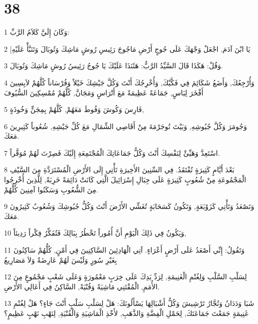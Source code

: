 \chapter{38}

\par 1 وَكَانَ إِلَيَّ كَلاَمُ الرَّبِّ:
\par 2 [يَا ابْنَ آدَمَ, اجْعَلْ وَجْهَكَ عَلَى جُوجٍ أَرْضِ مَاجُوجَ رَئِيسِ رُوشٍ مَاشِكَ وَتُوبَالَ وَتَنَبَّأْ عَلَيْهِ
\par 3 وَقُلْ: هَكَذَا قَالَ السَّيِّدُ الرَّبُّ: هَئَنَذَا عَلَيْكَ يَا جُوجُ رَئِيسُ رُوشٍ مَاشِكَ وَتُوبَالَ.
\par 4 وَأُرْجِعُكَ, وَأَضَعُ شَكَائِمَ فِي فَكَّيْكَ, وَأُخْرِجُكَ أَنْتَ وَكُلَّ جَيْشِكَ خَيْلاً وَفُرْسَاناً كُلَّهُمْ لاَبِسِينَ أَفْخَرَ لِبَاسٍ, جَمَاعَةً عَظِيمَةً مَعَ أَتْرَاسٍ وَمَجَانَّ, كُلَّهُمْ مُمْسِكِينَ السُّيُوفَ
\par 5 فَارِسَ وَكُوشَ وَفُوطَ مَعَهُمْ, كُلَّهُمْ بِمِجَنٍّ وَخُوذَةٍ,
\par 6 وَجُومَرَ وَكُلَّ جُيُوشِهِ, وَبَيْتَ تُوجَرْمَةَ مِنْ أَقَاصِي الشِّمَالِ مَعَ كُلِّ جَيْشِهِ, شُعُوباً كَثِيرِينَ مَعَكَ.
\par 7 اسْتَعِدَّ وَهَيِّئْ لِنَفْسِكَ أَنْتَ وَكُلُّ جَمَاعَاتِكَ الْمُجْتَمِعَةِ إِلَيْكَ فَصِرْتَ لَهُمْ مُوَقَّراً.
\par 8 بَعْدَ أَيَّامٍ كَثِيرَةٍ تُفْتَقَدُ. فِي السِّنِينَ الأَخِيرَةِ تَأْتِي إِلَى الأَرْضِ الْمُسْتَرَدَّةِ مِنَ السَّيْفِ الْمَجْمُوعَةِ مِنْ شُعُوبٍ كَثِيرَةٍ عَلَى جِبَالِ إِسْرَائِيلَ الَّتِي كَانَتْ دَائِمَةً خَرِبَةً, لِلَّذِينَ أُخْرِجُوا مِنَ الشُّعُوبِ وَسَكَنُوا آمِنِينَ كُلُّهُمْ.
\par 9 وَتَصْعَدُ وَتَأْتِي كَزَوْبَعَةٍ, وَتَكُونُ كَسَحَابَةٍ تُغَشِّي الأَرْضَ أَنْتَ وَكُلُّ جُيُوشِكَ وَشُعُوبٌ كَثِيرُونَ مَعَكَ.
\par 10 وَيَكُونُ فِي ذَلِكَ الْيَوْمِ أَنَّ أُمُوراً تَخْطُرُ بِبَالِكَ فَتُفَكِّرُ فِكْراً رَدِيئاً,
\par 11 وَتَقُولُ: إِنِّي أَصْعَدُ عَلَى أَرْضٍ أَعْرَاءٍ. آتِي الْهَادِئِينَ السَّاكِنِينَ فِي أَمْنٍ, كُلُّهُمْ سَاكِنُونَ بِغَيْرِ سُورٍ وَلَيْسَ لَهُمْ عَارِضَةٌ وَلاَ مَصَارِيعُ
\par 12 لِسَلْبِ السَّلْبِ وَلِغُنْمِ الْغَنِيمَةِ, لِرَدِّ يَدِكَ عَلَى خِرَبٍ مَعْمُورَةٍ وَعَلَى شَعْبٍ مَجْمُوعٍ مِنَ الأُمَمِ, الْمُقْتَنِي مَاشِيَةً وَقُنْيَةً, السَّاكِنُ فِي أَعَالِي الأَرْضِ.
\par 13 شَبَا وَدَدَانُ وَتُجَّارُ تَرْشِيشَ وَكُلُّ أَشْبَالِهَا يَسْأَلُونَكَ: هَلْ لِسَلْبِ سَلْبٍ أَنْتَ جَاءٍ؟ هَلْ لِغُنْمِ غَنِيمَةٍ جَمَعْتَ جَمَاعَتَكَ, لِحَمْلِ الْفِضَّةِ وَالذَّهَبِ, لأَخْذِ الْمَاشِيَةِ وَالْقُنْيَةِ, لِنَهْبِ نَهْبٍ عَظِيمٍ؟
